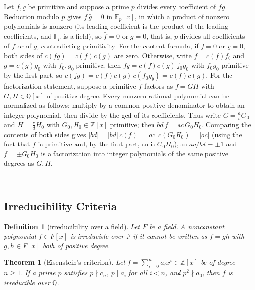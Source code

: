 \documentclass[11pt]{article}
\makeatletter
\theoremstyle{ntstyle}
\newtheorem{theorem}{Theorem}[subsection]
\newtheorem{definition}{Definition}[subsection]
\let\nt@closedisplay\]
\def\nt@guardedclose{\@ifnextchar\par{\nt@closeafterpar}{\@ifnextchar\end{\postdisplaypenalty\@M\nt@closedisplay}{\nt@closedisplay}}}
\def\nt@closeafterpar\par{\@ifnextchar\par{\nt@closeafterpar}{\@ifnextchar\end{\postdisplaypenalty\@M\nt@closedisplay\par}{\nt@closedisplay\par}}}
\renewenvironment{proof}[1][\proofname]{\par
  \pushQED{\qed}\normalfont\topsep\medskipamount\edef\nt@afterproof{\@endparpenalty=\the\@endparpenalty\relax}\@beginparpenalty\@M\@endparpenalty\@M\let\]\nt@guardedclose\trivlist\item[]\textit{#1\@addpunct{.}} \ignorespaces}{\ifvmode\addpenalty\@M\fi\popQED\nt@afterproof\endtrivlist\@endpefalse}
\makeatother
\begin{document}
\begin{proof} Let $f,g$ be primitive and suppose a prime
	$p$ divides every coefficient of $fg$. Reduction modulo $p$ gives $\bar f\,\bar g
		= 0$ in $\mathbb{F}_p[x]$, in which a product of nonzero polynomials is
	nonzero (its leading coefficient is the product of the leading
	coefficients, and $\mathbb{F}_p$ is a field), so $\bar f = 0$ or
	$\bar g = 0$, that is, $p$ divides all coefficients of $f$ or of $g$,
	contradicting primitivity. For the content formula, if $f=0$ or $g=0$,
	both sides of $c(fg)=c(f)c(g)$ are zero. Otherwise, write $f = c(f)f_0$
	and $g = c(g)g_0$ with $f_0, g_0$
	primitive; then $fg = c(f)c(g)\,f_0g_0$ with $f_0g_0$ primitive by the
	first part, so $c(fg) = c(f)c(g)\,c(f_0g_0) = c(f)c(g)$. For the
	factorization statement, suppose a
	primitive $f$ factors as $f=GH$ with $G,H\in\mathbb{Q}[x]$ of
	positive degree. Every nonzero rational polynomial can be normalized as follows: multiply by a common positive denominator to obtain an integer polynomial, then divide by the gcd of its coefficients. Thus write $G=\tfrac{a}{b}G_0$ and $H=\tfrac{c}{d}H_0$ with $G_0,H_0\in\mathbb{Z}[x]$ primitive; then $bd\,f=ac\,G_0H_0$.
	Comparing the contents of both sides gives
	$|bd|=|bd|\,c(f)=|ac|\,c(G_0H_0)=|ac|$ (using the fact that $f$ is primitive
	and, by the first part, so is $G_0H_0$), so $ac/bd=\pm1$ and $f=\pm
		G_0H_0$ is a factorization into integer polynomials of the same
	positive degrees as $G,H$.

\end{proof}
\subsection{Irreducibility Criteria}

\begin{definition}[irreducibility over a field]\label{def:11.3.1}
	Let $F$ be a field. A nonconstant polynomial $f\in F[x]$ is
	irreducible over $F$ if it cannot be written as $f=gh$ with
	$g,h\in F[x]$ both of positive degree.

\end{definition}
\begin{theorem}[Eisenstein's criterion]\label{thm:11.3.1} Let $f = \sum_{i=0}^n
		a_i x^i\in\mathbb{Z}[x]$ be of degree $n\ge1$. If a prime $p$ satisfies $p\nmid a_n$,
	$p\mid a_i$ for all $i<n$, and $p^2\nmid a_0$, then $f$ is
	irreducible over $\mathbb{Q}$.

\end{theorem}
\end{document}
